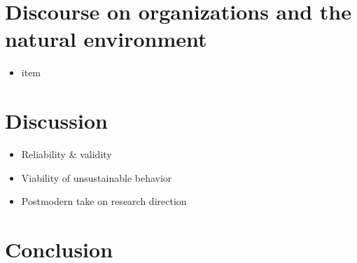 \documentclass{article}
\begin{document}

	\section*{Discourse on organizations and the natural environment}

	\begin{itemize}
		\item item
	\end{itemize}

	\section*{Discussion}

	\begin{itemize}
		\item Reliability \& validity
		\item Viability of unsustainable behavior
		\item Postmodern take on research direction
	\end{itemize}

	\section*{Conclusion}

	\clearpage
	
	
\end{document}
